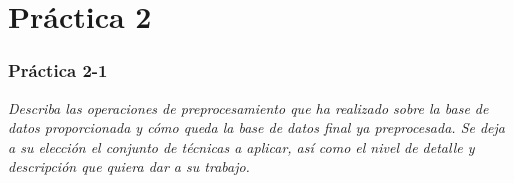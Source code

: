 \part{Práctica 2}
\section{Práctica 2-1}\label{p21}
\begin{center}
    \parbox{12cm}{\justify\textit{Describa las operaciones de preprocesamiento que ha realizado sobre la base de datos proporcionada y cómo queda la base de datos final ya preprocesada. Se deja a su elección el conjunto de técnicas a aplicar, así como el nivel de detalle y descripción que quiera dar a su trabajo.}}
\end{center}